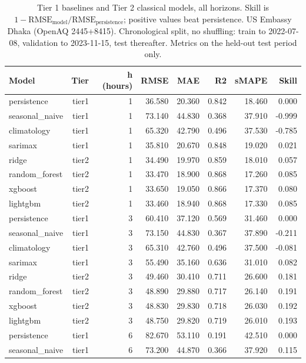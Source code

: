 \begin{table}[htbp]
\caption{Tier 1 baselines and Tier 2 classical models, all horizons. Skill is $1 - \mathrm{RMSE}_{\mathrm{model}}/\mathrm{RMSE}_{\mathrm{persistence}}$; positive values beat persistence. US Embassy Dhaka (OpenAQ 2445+8415). Chronological split, no shuffling: train to 2022-07-08, validation to 2023-11-15, test thereafter. Metrics on the held-out test period only.}
\label{tab:tier1_tier2_all_horizons}
\begin{tabular}{lrrrrrrr}
\toprule
Model & Tier & h (hours) & RMSE & MAE & R2 & sMAPE & Skill \\
\midrule
persistence & tier1 & 1 & 36.580 & 20.360 & 0.842 & 18.460 & 0.000 \\
seasonal\_naive & tier1 & 1 & 73.140 & 44.830 & 0.368 & 37.910 & -0.999 \\
climatology & tier1 & 1 & 65.320 & 42.790 & 0.496 & 37.530 & -0.785 \\
sarimax & tier1 & 1 & 35.810 & 20.670 & 0.848 & 19.020 & 0.021 \\
ridge & tier2 & 1 & 34.490 & 19.970 & 0.859 & 18.010 & 0.057 \\
random\_forest & tier2 & 1 & 33.470 & 18.900 & 0.868 & 17.260 & 0.085 \\
xgboost & tier2 & 1 & 33.650 & 19.050 & 0.866 & 17.370 & 0.080 \\
lightgbm & tier2 & 1 & 33.460 & 18.940 & 0.868 & 17.330 & 0.085 \\
persistence & tier1 & 3 & 60.410 & 37.120 & 0.569 & 31.460 & 0.000 \\
seasonal\_naive & tier1 & 3 & 73.150 & 44.830 & 0.367 & 37.890 & -0.211 \\
climatology & tier1 & 3 & 65.310 & 42.760 & 0.496 & 37.500 & -0.081 \\
sarimax & tier1 & 3 & 55.490 & 35.160 & 0.636 & 31.010 & 0.082 \\
ridge & tier2 & 3 & 49.460 & 30.410 & 0.711 & 26.600 & 0.181 \\
random\_forest & tier2 & 3 & 48.890 & 29.880 & 0.717 & 26.140 & 0.191 \\
xgboost & tier2 & 3 & 48.830 & 29.830 & 0.718 & 26.030 & 0.192 \\
lightgbm & tier2 & 3 & 48.750 & 29.820 & 0.719 & 26.010 & 0.193 \\
persistence & tier1 & 6 & 82.670 & 53.110 & 0.191 & 42.510 & 0.000 \\
seasonal\_naive & tier1 & 6 & 73.200 & 44.870 & 0.366 & 37.920 & 0.115 \\

\end{tabular}
\end{table}
